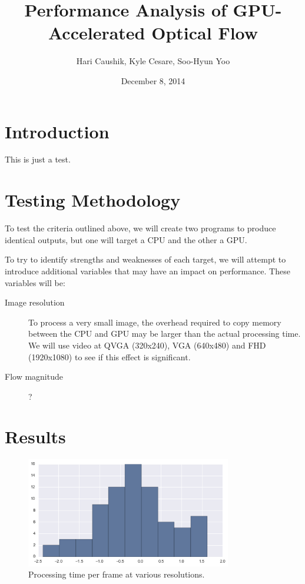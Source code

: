 \documentclass{article}
\title{Performance Analysis of GPU-Accelerated Optical Flow}
\date{December 8, 2014}
\author{Hari Caushik, Kyle Cesare, Soo-Hyun Yoo}
\begin{document}
\maketitle

\newpage

\tableofcontents

\newpage

\section{Introduction}
This is just a test.

\section{Testing Methodology}
To test the criteria outlined above, we will create two programs to produce
identical outputs, but one will target a CPU and the other a GPU.

To try to identify strengths and weaknesses of each target, we will attempt to
introduce additional variables that may have an impact on performance. These
variables will be:

\begin{description}
  \item[Image resolution] To process a very small image, the overhead required
    to copy memory between the CPU and GPU may be larger than the actual
    processing time. We will use video at QVGA (320x240), VGA (640x480) and FHD
    (1920x1080) to see if this effect is significant.
  \item[Flow magnitude] ?
\end{description}

\section{Results}

\begin{figure}[H]
  \centering
    \includegraphics[width=0.8\textwidth]{test_resolution.png}
  \caption{Processing time per frame at various resolutions.}
\end{figure}
\end{document}
